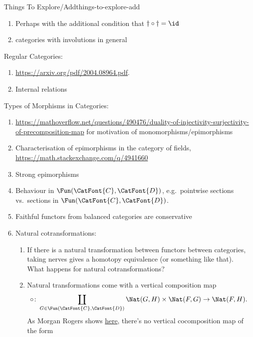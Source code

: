\begin{remark}{Things To Explore/Add}{things-to-explore-add}
\begin{enumerate}
\begin{enumerate}
\begin{enumerate}
                        \item Perhaps with the additional condition that $\dagger\circ\dagger=\id$
                        \item categories with involutions in general
                    \end{enumerate}
            \end{enumerate}
    \end{enumerate}
    Regular Categories:
    \begin{enumerate}
        \item \url{https://arxiv.org/pdf/2004.08964.pdf}.
        \item Internal relations
    \end{enumerate}
    Types of Morphisms in Categories:
    \begin{enumerate}
        \item \url{https://mathoverflow.net/questions/490476/duality-of-injectivity-surjectivity-of-precomposition-map} for motivation of monomorphisms/epimorphisms
        \item Characterisation of epimorphisms in the category of fields, \url{https://math.stackexchange.com/q/4941660}
        \item Strong epimorphisms
        \item Behaviour in $\Fun(\CatFont{C},\CatFont{D})$, e.g.\ pointwise sections vs.\ sections in $\Fun(\CatFont{C},\CatFont{D})$.
        \item Faithful functors from balanced categories are conservative
        \item Natural cotransformations:
            \begin{enumerate}
                \item If there is a natural transformation between functors between categories, taking nerves gives a homotopy equivalence (or something like that). What happens for natural cotransformations?
                \item Natural transformations come with a vertical composition map
                    \[
                        \circ%
                        \colon%
                        \coprod_{G\in\Fun(\CatFont{C},\CatFont{D})}\Nat(G,H)\times\Nat(F,G)%
                        \to%
                        \Nat(F,H).%
                    \]%
                    As Morgan Rogers shows \href{https://categorytheory.zulipchat.com/#narrow/stream/229136-theory.3A-category-theory/topic/.E2.80.9CNatural.20cotransformations.E2.80.9D/near/436863628}{here}, there's no vertical cocomposition map of the form

\end{enumerate}
\end{enumerate}
\end{remark}
